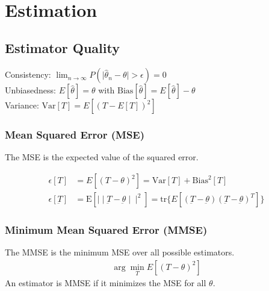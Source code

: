 \vspace*{24pt}\\
\section{Estimation}
\begin{mdframed}[style=eqbox]
  \subsection{Estimator Quality}
  Consistency: $\lim_{n \rightarrow \infty} P(\mid \hat{\theta}_n - \theta \mid > \epsilon) = 0$\\
  Unbiasedness: $E[\hat{\theta}] = \theta$ with $\text{Bias}[\hat{\theta}] = E[\hat{\theta}] - \theta$\\
  Variance: $\text{Var}[T] = E[(T - E[T])^2]$
  \subsubsection{Mean Squared Error (MSE)}
  The MSE is the expected value of the squared error.
  \begin{mdframed}[style=redbox]
    \vspace*{-10pt}
    \begin{align*}
      \epsilon[T] &= E[(T - \theta)^2] = \text{Var}[T] + \text{Bias}^2[T]\\
      \epsilon[\underbar{T}] &= \text{E}[\mid\mid \underbar{T} - \underbar{\theta} \mid\mid^2] = \text{tr}\{E[(\underbar{T} - \underbar{\theta})(\underbar{T} - \underbar{\theta})^T]\}
    \end{align*}
  \end{mdframed}
  \subsubsection{Minimum Mean Squared Error (MMSE)}
  The MMSE is the minimum MSE over all possible estimators.
  \begin{align*}
    \arg \min_T E[(T - \theta)^2]
  \end{align*}
  An estimator is MMSE if it minimizes the MSE for all $\theta$.
\end{mdframed}

